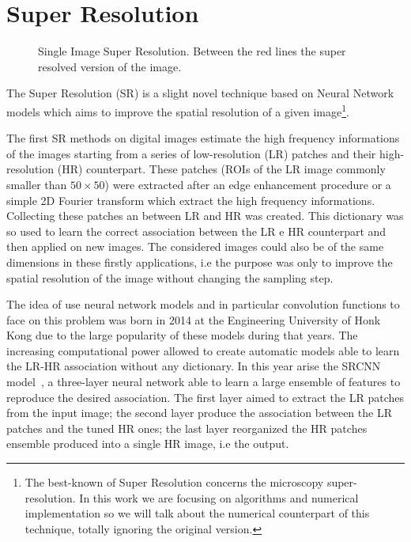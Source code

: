 \documentclass{standalone}
\begin{document}
\section[Super Resolution]{Super Resolution}\label{SR:sr}

\begin{figure}[htbp]
\def\svgwidth{0.5\textwidth}

\quad
\def\svgwidth{0.5\textwidth}

\caption{Single Image Super Resolution.
Between the red lines the super resolved version of the image.
}
\label{fig:sr_wow}
\end{figure}

The Super Resolution (SR) is a slight novel technique based on Neural Network models which aims to improve the spatial resolution of a given image\footnote{
  The best-known  of Super Resolution concerns the microscopy super-resolution.
  In this work we are focusing on algorithms and numerical implementation so we will talk about the numerical counterpart of this technique, totally ignoring the original  version.
}.

The first SR methods on digital images estimate the high frequency informations of the images starting from a series of low-resolution (LR) patches and their high-resolution (HR) counterpart.
These patches (ROIs of the LR image commonly smaller than $50\times50$) were extracted after an edge enhancement procedure or a simple 2D Fourier transform which extract the high frequency informations.
Collecting these patches an  between LR and HR was created.
This dictionary was so used to learn the correct association between the LR e HR counterpart and then applied on new images.
The considered images could also be of the same dimensions in these firstly applications, i.e the purpose was only to improve the spatial resolution of the image without changing the sampling step.

The idea of use neural network models and in particular convolution functions to face on this problem was born in 2014 at the Engineering University of Honk Kong due to the large popularity of these models during that years.
The increasing computational power allowed to create automatic models able to learn the LR-HR association without any dictionary.
In this year arise the SRCNN model~\cite{SRCNN}, a three-layer neural network able to learn a large ensemble of features to reproduce the desired association.
The first layer aimed to extract the LR patches from the input image; the second layer produce the association between the LR patches and the tuned HR ones; the last layer reorganized the HR patches ensemble produced into a single HR image, i.e the output.
\end{document}
